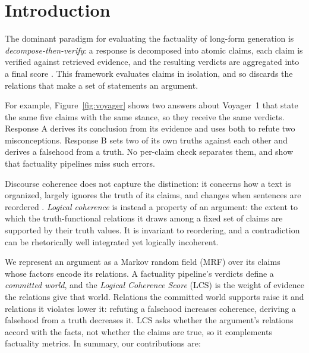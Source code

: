 \section{Introduction}
\label{sec:intro}
\label{sec:voyager}

The dominant paradigm for evaluating the factuality of long-form generation is \emph{decompose-then-verify}: 
a response is decomposed into atomic claims, each claim is verified against retrieved evidence, 
and the resulting verdicts are aggregated into a final score
\citep{factscore,safe,veriscore,factreasoner}. This framework evaluates claims in isolation, and so discards the relations that make a set of
statements an argument. 

For example, Figure~\ref{fig:voyager} shows two answers about Voyager~1 that state the
same five claims with the same stance, so they receive the same verdicts. Response A derives its conclusion
from its evidence and uses both to refute two misconceptions. Response B sets two of its own truths against
each other and derives a falsehood from a truth. No per-claim check separates them, and
\citet{lorefact} show that factuality pipelines miss such errors.

Discourse coherence does not capture the distinction: it concerns how a text is organized, largely
ignores the truth of its claims, and changes when sentences are reordered \citep{grosz1995,barzilay}.
\emph{Logical coherence} is instead a property of an argument: the extent to which the
truth-functional relations it draws among a fixed set of claims are supported by their truth values.
It is invariant to reordering, and a contradiction can be rhetorically well integrated yet logically
incoherent.



We represent an argument as a Markov random field (MRF) over its claims whose factors encode its
relations. A factuality pipeline's verdicts define a \emph{committed world}, and the \emph{Logical
Coherence Score} (LCS) is the weight of evidence \citep{good1950} the relations give that world. 
Relations the committed world supports raise it and relations it violates lower it: refuting a
falsehood increases coherence, deriving a falsehood from a truth decreases it. LCS asks whether the
argument's relations accord with the facts, not whether the claims are true, so it complements
factuality metrics. %
In summary, our contributions are:

